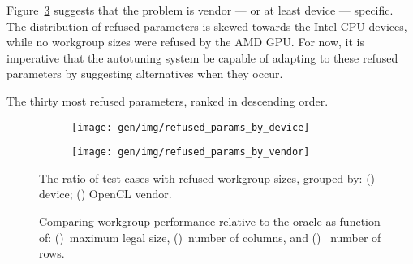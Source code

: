 Figure~\ref{fig:refused-params-by-dev-vendor} suggests that the
problem is vendor --- or at least device --- specific. The
distribution of refused parameters is skewed towards the Intel CPU
devices, while no workgroup sizes were refused by the AMD
GPU.  For now, it is imperative that the
autotuning system be capable of adapting to these refused parameters
by suggesting alternatives when they occur.

\begin{table}
\parbox{.32\linewidth}{
    \centering
    \scriptsize
    
  }
  \hfill
  \parbox{.32\linewidth}{
    \centering
    \scriptsize
    
  }
  \hfill
  \parbox{.32\linewidth}{
    \centering
    \scriptsize
    
  }
  \caption{The thirty most refused parameters, ranked in descending
    order.}
  \label{tab:top-refused-params}
\end{table}

\begin{figure}
\centering
\begin{subfigure}[h]{.45\textwidth}
  \centering
  \texttt{[image: gen/img/refused\_params\_by\_device]}
  \caption{}
  \label{fig:refused-params-by-device}
\end{subfigure}
\hfill
\begin{subfigure}[h]{.45\textwidth}
  \centering
  \texttt{[image: gen/img/refused\_params\_by\_vendor]}
  \caption{}
  \label{fig:refused-params-by-vendor}
\end{subfigure}
\caption{%
  The ratio of test cases with refused workgroup sizes, grouped by:
  () device;
  () OpenCL vendor.%
}
\label{fig:refused-params-by-dev-vendor}
\end{figure}



\cleardoublepage
\begin{figure}

\caption{%
  Comparing workgroup performance relative to the oracle as function
  of: ()~maximum legal size,
  ()~number of columns, and
  ()~ number of rows.%
}
\label{fig:performance-wgsizes}
\end{figure}

